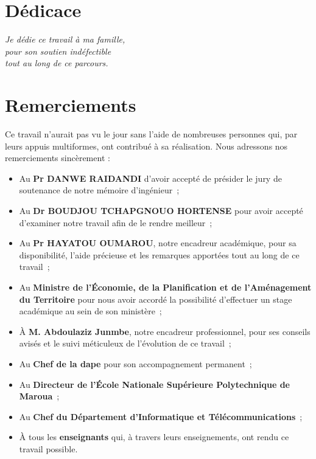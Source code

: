 \documentclass[12pt, a4paper, oneside]{report}
\begin{document}
\setcounter{page}{1}

\chapter*{Dédicace}
\thispagestyle{plain}

\vspace{4cm}
\begin{flushright}
  \begin{minipage}{0.6\textwidth}
    \itshape\large
    Je dédie ce travail à ma famille,\\[6pt]
    pour son soutien indéfectible\\
    tout au long de ce parcours.
  \end{minipage}
\end{flushright}
\vfill

\chapter*{Remerciements}
\thispagestyle{plain}

Ce travail n'aurait pas vu le jour sans l'aide de nombreuses personnes qui, par leurs appuis multiformes, ont contribué à sa réalisation. Nous adressons nos remerciements sincèrement :

\begin{itemize}
  \item Au \textbf{Pr DANWE RAIDANDI} d'avoir accepté de présider le jury de soutenance de notre mémoire d'ingénieur~;
  \item Au \textbf{Dr BOUDJOU TCHAPGNOUO HORTENSE} pour avoir accepté d'examiner notre travail afin de le rendre meilleur~;
  \item Au \textbf{Pr HAYATOU OUMAROU}, notre encadreur académique, pour sa disponibilité, l'aide précieuse et les remarques apportées tout au long de ce travail~;
  \item Au \textbf{Ministre de l'Économie, de la Planification et de l'Aménagement du Territoire} pour nous avoir accordé la possibilité d'effectuer un stage académique au sein de son ministère~;
  \item À \textbf{M. Abdoulaziz Junmbe}, notre encadreur professionnel, pour ses conseils avisés et le suivi méticuleux de l'évolution de ce travail~;
  \item Au \textbf{Chef de la \gls{dape}} pour son accompagnement permanent~;
  \item Au \textbf{Directeur de l'École Nationale Supérieure Polytechnique de Maroua}~;
  \item Au \textbf{Chef du Département d'Informatique et Télécommunications}~;
  \item À tous les \textbf{enseignants} qui, à travers leurs enseignements, ont rendu ce travail possible.
\end{itemize}
\end{document}
